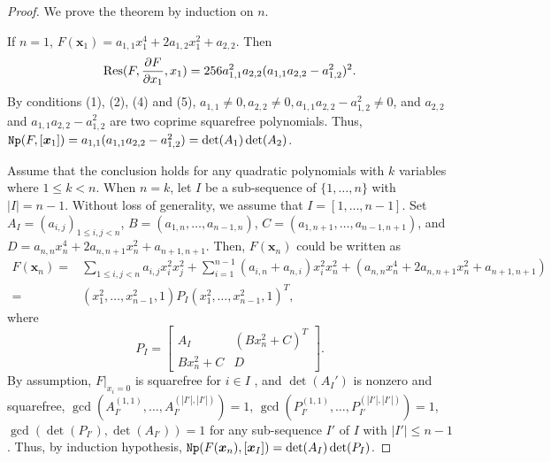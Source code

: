 \documentclass[amsthm]{elsart}
\def \Res  {{\rm Res}}
\def  \Nproj {{\tt Np}}
\newcommand{\xx}{\bm{x}}
\begin{document}
\begin{proof}
  We prove the theorem by induction on $n$.

  If $n=1$, $F(\xx_1)=a_{1,1}x_1^4+2a_{1,2}x_1^2+a_{2,2}$. Then $$\Res(F,\frac{\partial F}{\partial x_1},x_1)=256a_{1,1}^2a_{2,2}(a_{1,1}a_{2,2}-a_{1,2}^2)^2.$$ By conditions (1), (2), (4) and (5), $a_{1,1}\neq0
, a_{2,2}\neq0, a_{1,1}a_{2,2}-a_{1,2}^2\neq0$, and $a_{2,2}$ and $a_{1,1}a_{2,2}-a_{1,2}^2$ are two coprime squarefree polynomials. Thus,
  $\Nproj(F,[\xx_1])=a_{1,1}(a_{1,1}a_{2,2}-a_{1,2}^2)=\det(A_1)\det(A_2)$.

  Assume that the conclusion holds for any quadratic polynomials with $k$ variables where $1\le k < n$. When $n=k$,
  let $I$ be a sub-sequence of $\{1,\dots,n\}$ with $|I|=n-1$. Without loss of generality, we assume that $I=[1,\dots,n-1]$. Set $A_{I}=(a_{i,j})_{1\le i,j< n}$, $B=(a_{1,n},\ldots,a_{n-1,n})$, $C=(a_{1,n+1},\ldots,a_{n-1,n+1})$, and $D=a_{n,n}x_n^4+2a_{n,n+1}x_n^2+a_{n+1,n+1}$. Then, $F(\xx_n)$ could be written as
  \begin{align*}
    F(\xx_{n})=&\sum_{1\le i,j< n} a_{i,j}x_i^2x_j^2+\sum_{i=1}^{n-1} (a_{i,n}+a_{n,i})x_i^2x_n^2+(a_{n,n}x_n^4+2a_{n,n+1}x_n^2+a_{n+1,n+1})\\
=&(x_1^2,\dots,x_{n-1}^2,1)P_{I}(x_1^2,\dots,x_{n-1}^2,1)^T,
  \end{align*}
  where  $$P_{I}=\begin{bmatrix} A_{I} & (Bx_n^2+C)^T \\ Bx_n^2+C & D \end{bmatrix}.$$
By assumption, $F|_{x_i=0}$ is squarefree for $i\in I$
  , and $\det(A_I')$ is nonzero and squarefree, $\gcd(A_{I'}^{(1,1)},\dots,A_{I'}^{(|I'|,|I'|)})=1$, $\gcd(P_{I'}^{(1,1)},\dots,P_{I'}^{(|I'|,|I'|)})=1$, $\gcd(\det(P_{I'}),\det(A_{I'}))=1$ for any sub-sequence $I'$ of $I$ with $|I'|\le n-1 $. Thus, by induction hypothesis, $\Nproj(F(\xx_n),[\xx_I])=\det(A_I)\det(P_{I})$.


\end{proof}
\end{document}
